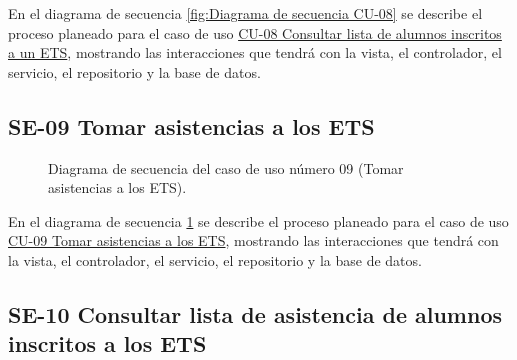 En el diagrama de secuencia \ref{fig:Diagrama de secuencia CU-08} se describe el proceso planeado para el caso de uso \hyperlink{CU-08}{CU-08 Consultar lista de alumnos inscritos a un ETS}, mostrando las interacciones que tendrá con la vista, el controlador, el servicio, el repositorio y la base de datos.

\newpage

\subsection{SE-09 Tomar asistencias a los ETS}

\begin{figure}[htbp!]
	\begin{center}
		\caption{Diagrama de secuencia del caso de uso número 09 (Tomar asistencias a los ETS).}
		\label{fig:Diagrama de secuencia CU-09}
	\end{center}
\end{figure}

En el diagrama de secuencia \ref{fig:Diagrama de secuencia CU-09} se describe el proceso planeado para el caso de uso \hyperlink{CU-09}{CU-09 Tomar asistencias a los ETS}, mostrando las interacciones que tendrá con la vista, el controlador, el servicio, el repositorio y la base de datos.

\subsection{SE-10 Consultar lista de asistencia de alumnos inscritos a los ETS}

